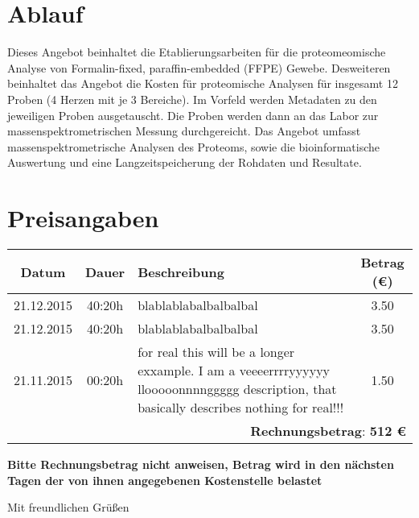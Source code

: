 \documentclass[a4paper,oneside,11pt,DIV=14]{scrartcl}
\begin{document}
\angebot %

\section*{Ablauf}
Dieses Angebot beinhaltet die Etablierungsarbeiten für die proteomeomische Analyse von Formalin-fixed, paraffin-embedded (FFPE) Gewebe. Desweiteren beinhaltet das Angebot die Kosten für proteomische Analysen für insgesamt 12 Proben (4 Herzen mit je 3 Bereiche). Im Vorfeld werden Metadaten zu den jeweiligen Proben ausgetauscht. Die Proben werden dann an das Labor zur massenspektrometrischen Messung durchgereicht. Das Angebot umfasst massenspektrometrische Analysen des Proteoms, sowie die bioinformatische Auswertung und eine Langzeitspeicherung der Rohdaten und Resultate.
\section*{Preisangaben}
{
\renewcommand{\arraystretch}{2}
\footnotesize
\begin{tabular}{ccp{}c}
 \hline
 \textbf{Datum} & \textbf{Dauer} & \textbf{Beschreibung} & \textbf{Betrag (\euro)} \\
    \hline
   21.12.2015 & 40:20h & blablablabalbalbalbal & 3.50 \\
    \hline
   21.12.2015 & 40:20h & blablablabalbalbalbal & 3.50 \\
    \hline
   21.11.2015 & 00:20h & for real this will be a longer exxample. I am a veeeerrrryyyyyy llooooonnnnggggg   description, that basically describes nothing for real!!! & 1.50 \\
  \hline
 &\multicolumn{3}{r}{\textbf{Rechnungsbetrag}: \textbf{512 \euro}}

\end{tabular}
}
\vspace{10 mm}

\textbf{Bitte Rechnungsbetrag nicht anweisen, Betrag wird in den n\"{a}chsten
Tagen der von ihnen angegebenen Kostenstelle belastet}

\vspace{10 mm}
Mit freundlichen Gr\"{u}{\ss}en
\end{document}
